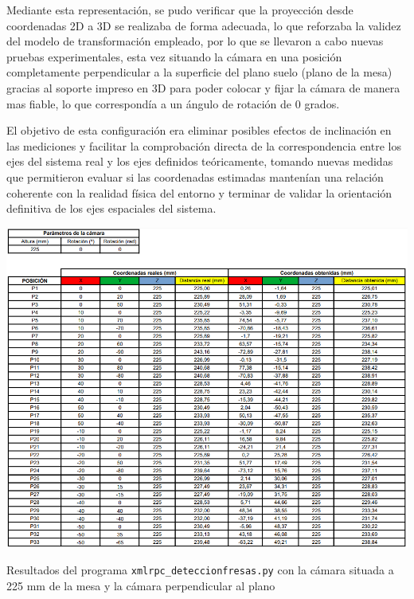 Mediante esta representación, se pudo verificar que la proyección desde coordenadas 2D a 3D se realizaba de forma adecuada, lo que reforzaba la validez del modelo de transformación empleado, por lo que se llevaron a cabo nuevas pruebas experimentales, esta vez situando la cámara en una posición completamente perpendicular a la superficie del plano suelo (plano de la mesa) gracias al soporte impreso en 3D para poder colocar y fijar la cámara de manera mas fiable, lo que correspondía a un ángulo de rotación de 0 grados. 

El objetivo de esta configuración era eliminar posibles efectos de inclinación en las mediciones y facilitar la comprobación directa de la correspondencia entre los ejes del sistema real y los ejes definidos teóricamente, tomando nuevas medidas que permitieron evaluar si las coordenadas estimadas mantenían una relación coherente con la realidad física del entorno y terminar de validar la orientación definitiva de los ejes espaciales del sistema.

  \begin{table}[H]
     \centering
     \begin{center}
       \includegraphics[width=155mm]{figs/Resultados 225 mm 0 grados.png}
     \end{center}
     \caption{Resultados del programa \texttt{xmlrpc\_deteccionfresas.py} con la cámara situada a 225 mm de la mesa y la cámara perpendicular al plano}
     \label{tab:resultados_180mm_58grados}
  \end{table}

